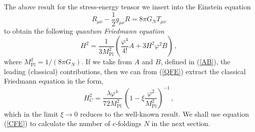 The above result for the stress-energy tensor we insert into the Einstein
equation
\begin{equation}
R_{\mu\nu} -\frac12g_{\mu\nu}R = 8\pi G_N T_{\mu\nu}
\end{equation}
to obtain the following \textit{quantum Friedmann equation}
\begin{equation}
 H^2 = \frac{1}{3M_{\mathrm{Pl}}^2}\left(\frac{\varphi^4}{4!} A
+3H^2\varphi^2 B\right)
\,,
\label{QFE}
\end{equation}
where $M^2_{\mathrm{Pl}}= 1/(8\pi G_N)$. If we
take from $A$ and $B$, defined in ({\ref{AB}}), the leading
(classical) contributions, then we can from (\ref{QFE}) extract the
classical Friedmann equation in the form,
\begin{equation}
H^2_C =
\frac{\lambda\varphi^4}{72M^2_{\mathrm{Pl}}}\,\left(1-\xi\frac{\varphi^2}{M^2_{\mathrm{Pl}}}\right)^{-1}\,,
\label{CFE}
\end{equation}
which in the limit $\xi\rightarrow 0$ reduces to the well-known
result. We shall use equation (\ref{CFE}) to calculate the
number of $e$-foldings $N$ in the next section.

